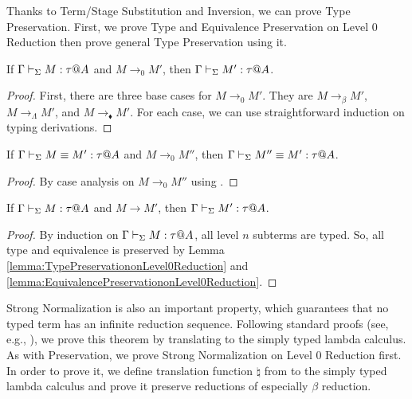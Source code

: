 
Thanks to Term/Stage Substitution and Inversion, we can prove Type
Preservation.  First, we prove Type and Equivalence Preservation on Level 0
Reduction then prove general Type Preservation using it.

\begin{lemma}
    \label{lemma:TypePreservationonLevel0Reduction}
    If \( \Gamma \vdash_\Sigma M : \tau @ A \) and \( M \longrightarrow_0 M' \), then \( \Gamma \vdash_\Sigma M' : \tau @ A \).
\end{lemma}

\begin{proof}
    First, there are three base cases for $M \longrightarrow_0 M'$.  They are $M
    \longrightarrow_\beta M'$, $M \longrightarrow_\Lambda M'$, and $M
    \longrightarrow_\blacklozenge M'$.  For each case, we can use
    straightforward induction on typing derivations.
\end{proof}

\begin{lemma}
    \label{lemma:EquivalencePreservationonLevel0Reduction}
    If \( \Gamma \vdash_\Sigma M \equiv M' : \tau @ A \) and \( M \longrightarrow_0 M'' \), then \( \Gamma \vdash_\Sigma M'' \equiv M' : \tau @ A \).
\end{lemma}

\begin{proof}
    By case analysis on \( M \longrightarrow_0 M'' \) using \QTrans.
\end{proof}

\begin{theorem}
    \label{theorem:TypePreservation}
    If \( \Gamma \vdash_\Sigma M : \tau @ A \) and \( M \longrightarrow M' \), then \( \Gamma \vdash_\Sigma M' : \tau @ A \).
\end{theorem}

\begin{proof} 
    By induction on \( \Gamma \vdash_\Sigma M : \tau @ A \), all level \( n \) subterms are
    typed. So, all type and equivalence is preserved by Lemma
    \ref{lemma:TypePreservationonLevel0Reduction} and
    \ref{lemma:EquivalencePreservationonLevel0Reduction}.
\end{proof}


Strong Normalization is also an important property, which guarantees that no
typed term has an infinite reduction sequence.  Following standard proofs (see,
e.g., \cite{harper1993framework}), we prove this theorem by translating \LMD to
the simply typed lambda calculus. As with Preservation, we prove Strong
Normalization on Level 0 Reduction first. In order to prove it, we define
translation function \( \natural \) from \LMD to the simply typed lambda
calculus and prove it preserve reductions of \LMD especially \( \beta \)
reduction.

